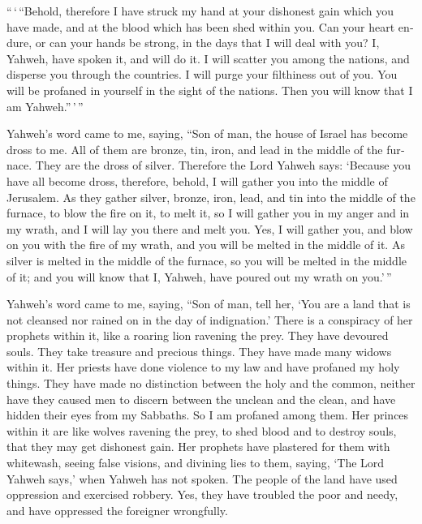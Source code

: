 \begin{paracol}{2}
\begin{otherlanguage}{english}
 ``\,`\,``Behold, therefore I have struck my hand at your
dishonest gain which you have made, and at the blood which has been shed
within you.  Can your heart endure, or can your hands be
strong, in the days that I will deal with you? I, Yahweh, have spoken
it, and will do it.  I will scatter you among the
nations, and disperse you through the countries. I will purge your
filthiness out of you.  You will be profaned in yourself
in the sight of the nations. Then you will know that I am
Yahweh.''\,'\,''

 Yahweh's word came to me, saying,  ``Son
of man, the house of Israel has become dross to me. All of them are
bronze, tin, iron, and lead in the middle of the furnace. They are the
dross of silver.  Therefore the Lord Yahweh says:
`Because you have all become dross, therefore, behold, I will gather you
into the middle of Jerusalem.  As they gather silver,
bronze, iron, lead, and tin into the middle of the furnace, to blow the
fire on it, to melt it, so I will gather you in my anger and in my
wrath, and I will lay you there and melt you.  Yes, I
will gather you, and blow on you with the fire of my wrath, and you will
be melted in the middle of it.  As silver is melted in
the middle of the furnace, so you will be melted in the middle of it;
and you will know that I, Yahweh, have poured out my wrath on you.'\,''

 Yahweh's word came to me, saying,  ``Son
of man, tell her, `You are a land that is not cleansed nor rained on in
the day of indignation.'  There is a conspiracy of her
prophets within it, like a roaring lion ravening the prey. They have
devoured souls. They take treasure and precious things. They have made
many widows within it.  Her priests have done violence to
my law and have profaned my holy things. They have made no distinction
between the holy and the common, neither have they caused men to discern
between the unclean and the clean, and have hidden their eyes from my
Sabbaths. So I am profaned among them.  Her princes
within it are like wolves ravening the prey, to shed blood and to
destroy souls, that they may get dishonest gain.  Her
prophets have plastered for them with whitewash, seeing false visions,
and divining lies to them, saying, `The Lord Yahweh says,' when Yahweh
has not spoken.  The people of the land have used
oppression and exercised robbery. Yes, they have troubled the poor and
needy, and have oppressed the foreigner wrongfully.


\end{otherlanguage}
\end{paracol}

